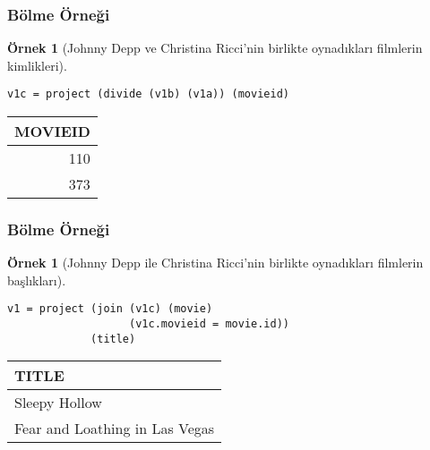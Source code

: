 \documentclass[dvipsnames]{beamer}
\theoremstyle{definition}
\theoremstyle{example}
\newtheorem{ornek}[theorem]{Örnek}
\theoremstyle{plain}
\begin{document}
\begin{frame}[fragile]
  \frametitle{Bölme Örneği}

  \begin{ornek}[Johnny Depp ve Christina Ricci'nin birlikte oynadıkları
                filmlerin kimlikleri]
    \begin{lstlisting}
v1c = project (divide (v1b) (v1a)) (movieid)
    \end{lstlisting}

    \pause
    \begin{tiny}
    \begin{table}
      \begin{tabular}{|r|}\hline
MOVIEID \\\hline\hline
    110 \\\hline
    373 \\\hline
      \end{tabular}
    \end{table}
    \end{tiny}
  \end{ornek}
\end{frame}

\begin{frame}[fragile]
  \frametitle{Bölme Örneği}

  \begin{ornek}[Johnny Depp ile Christina Ricci'nin birlikte oynadıkları
                filmlerin başlıkları]
    \begin{lstlisting}
v1 = project (join (v1c) (movie)
                   (v1c.movieid = movie.id))
             (title)
    \end{lstlisting}

    \pause
    \begin{tiny}
    \begin{table}
      \begin{tabular}{|l|}\hline
TITLE                         \\\hline\hline
Sleepy Hollow                 \\\hline
Fear and Loathing in Las Vegas\\\hline
      \end{tabular}
    \end{table}
    \end{tiny}
  \end{ornek}
\end{frame}
\end{document}
